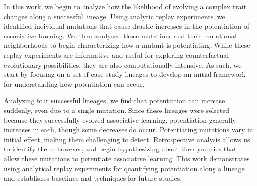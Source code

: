 In this work, we begin to analyze how the likelihood of evolving a complex trait changes along a successful lineage.
Using analytic replay experiments, we identified individual mutations that cause drastic increases in the potentiation of associative learning. 
We then analyzed those mutations and their mutational neighborhoods to begin characterizing how a mutant is potentiating.  
While these replay experiments are informative and useful for exploring counterfactual evolutionary possibilities, they are also computationally intensive.  
As such, %
we start by focusing on a set of case-study lineages to develop an initial framework for understanding how potentiation can occur.

Analyzing four successful lineages, we find that potentiation can increase suddenly, even due to a single mutation.
Since these lineages were selected because they successfully evolved associative learning, potentiation generally increases in each, though some decreases do occur.
Potentiating mutations vary in initial effect, making them challenging to detect.
Retrospective analysis allows us to identify them, however, and begin hypothesizing about the dynamics that allow these mutations to potentiate associative learning.
This work demonstrates using analytical replay experiments for quantifying potentiation along a lineage and establishes baselines and techniques for future studies. 
